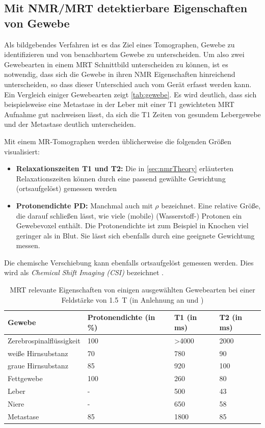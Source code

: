 \subsection{Mit NMR/MRT detektierbare Eigenschaften von Gewebe}
Als bildgebendes Verfahren ist es das Ziel eines Tomographen, Gewebe zu identifizieren und von benachbartem Gewebe zu unterscheiden. Um also zwei Gewebearten in einem MRT Schnittbild unterscheiden zu können, ist es notwendig, dass sich die Gewebe in ihren NMR Eigenschaften hinreichend unterscheiden, so dass dieser Unterschied auch vom Gerät erfasst werden kann. Ein Vergleich einiger Gewebearten zeigt \autoref{tab:gewebe}. Es wird deutlich, dass sich beispielsweise eine Metastase in der Leber mit einer T1 gewichteten MRT Aufnahme gut nachweisen lässt, da sich die T1 Zeiten von gesundem Lebergewebe und der Metastase deutlich unterscheiden.

Mit einem MR-Tomographen werden üblicherweise die folgenden Größen visualisiert:
\begin{itemize}
	\item \textbf{Relaxationszeiten T1 und T2:} Die in \autoref{sec:nmrTheory} erläuterten Relaxationszeiten können durch eine passend gewählte Gewichtung (ortsaufgelöst) gemessen werden
	\item \textbf{Protonendichte PD:} Manchmal auch mit $\rho$ bezeichnet. Eine relative Größe, die darauf schließen lässt, wie viele (mobile) (Wasserstoff-) Protonen ein Gewebevoxel enthält. Die Protonendichte ist zum Beispiel in Knochen viel geringer als in Blut. Sie lässt sich ebenfalls durch eine geeignete Gewichtung messen.  
\end{itemize}

Die chemische Verschiebung kann ebenfalls ortsaufgelöst gemessen werden. Dies wird als \textit{Chemical Shift Imaging (CSI)} bezeichnet \cite{Keevil2006}.

\begin{table}[H]
	\centering
	\caption[MRT relevante Eigenschaften ausgewählter Gewebe]{MRT relevante Eigenschaften von einigen ausgewählten Gewebearten bei einer Feldstärke von \SI{1.5}{\tesla} (in Anlehnung an \cite[S.~16]{Weishaupt2014} und \cite[S.~17]{Reiser2008})}
	\label{tab:gewebe}
	\begin{tabular}{llll}
		\toprule
		\textbf{Gewebe} & \textbf{Protonendichte (in \%)} & \textbf{T1 (in ms)} & \textbf{T2 (in ms)} \\
		\midrule
		Zerebrospinalflüssigkeit & 100 & \textgreater4000 & 2000 \\
		weiße Hirnsubstanz & 70 & 780 & 90 \\
		graue Hirnsubstanz & 85 & 920 & 100 \\
		Fettgewebe & 100 & 260 & 80 \\
		Leber & - & 500 & 43 \\
		Niere & - & 650 & 58 \\
		Metastase & 85 & 1800 & 85 \\
		\bottomrule
	\end{tabular}
\end{table}

